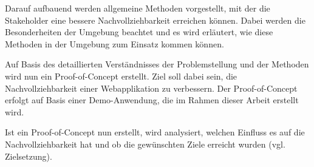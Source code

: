 

Darauf aufbauend werden allgemeine Methoden vorgestellt, mit der die Stakeholder eine bessere Nachvollziehbarkeit erreichen können. Dabei werden die Besonderheiten der Umgebung beachtet und es wird erläutert, wie diese Methoden in der Umgebung zum Einsatz kommen können.


Auf Basis des detaillierten Verständnisses der Problemstellung und der Methoden wird nun ein Proof-of-Concept erstellt. Ziel soll dabei sein, die Nachvollziehbarkeit einer Webapplikation zu verbessern. Der Proof-of-Concept erfolgt auf Basis einer Demo-Anwendung, die im Rahmen dieser Arbeit erstellt wird.

Ist ein Proof-of-Concept nun erstellt, wird analysiert, welchen Einfluss es auf die Nachvollziehbarkeit hat und ob die gewünschten Ziele erreicht wurden (vgl. Zielsetzung).




